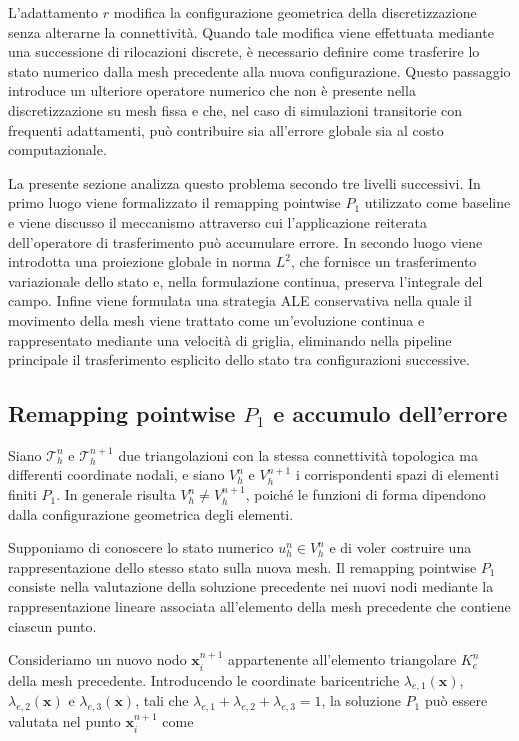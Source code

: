 L'adattamento $r$ modifica la configurazione geometrica della discretizzazione senza alterarne la connettività. Quando tale modifica viene effettuata mediante una successione di rilocazioni discrete, è necessario definire come trasferire lo stato numerico dalla mesh precedente alla nuova configurazione. Questo passaggio introduce un ulteriore operatore numerico che non è presente nella discretizzazione su mesh fissa e che, nel caso di simulazioni transitorie con frequenti adattamenti, può contribuire sia all'errore globale sia al costo computazionale.

La presente sezione analizza questo problema secondo tre livelli successivi. In primo luogo viene formalizzato il remapping pointwise $P_1$ utilizzato come baseline e viene discusso il meccanismo attraverso cui l'applicazione reiterata dell'operatore di trasferimento può accumulare errore. In secondo luogo viene introdotta una proiezione globale in norma $L^2$, che fornisce un trasferimento variazionale dello stato e, nella formulazione continua, preserva l'integrale del campo. Infine viene formulata una strategia ALE conservativa nella quale il movimento della mesh viene trattato come un'evoluzione continua e rappresentato mediante una velocità di griglia, eliminando nella pipeline principale il trasferimento esplicito dello stato tra configurazioni successive.

\subsection{Remapping pointwise \texorpdfstring{$P_1$}{P1} e accumulo dell'errore}
\label{subsec:remap_dissipation}

Siano $\mathcal{T}_h^n$ e $\mathcal{T}_h^{n+1}$ due triangolazioni con la stessa connettività topologica ma differenti coordinate nodali, e siano $V_h^n$ e $V_h^{n+1}$ i corrispondenti spazi di elementi finiti $P_1$. In generale risulta $V_h^n\neq V_h^{n+1}$, poiché le funzioni di forma dipendono dalla configurazione geometrica degli elementi.

Supponiamo di conoscere lo stato numerico $u_h^n\in V_h^n$ e di voler costruire una rappresentazione dello stesso stato sulla nuova mesh. Il remapping pointwise $P_1$ consiste nella valutazione della soluzione precedente nei nuovi nodi mediante la rappresentazione lineare associata all'elemento della mesh precedente che contiene ciascun punto.

Consideriamo un nuovo nodo $\mathbf{x}_i^{n+1}$ appartenente all'elemento triangolare $K_e^n$ della mesh precedente. Introducendo le coordinate baricentriche $\lambda_{e,1}(\mathbf{x})$, $\lambda_{e,2}(\mathbf{x})$ e $\lambda_{e,3}(\mathbf{x})$, tali che $\lambda_{e,1} + \lambda_{e,2} + \lambda_{e,3} = 1$, la soluzione $P_1$ può essere valutata nel punto $\mathbf{x}_i^{n+1}$ come

